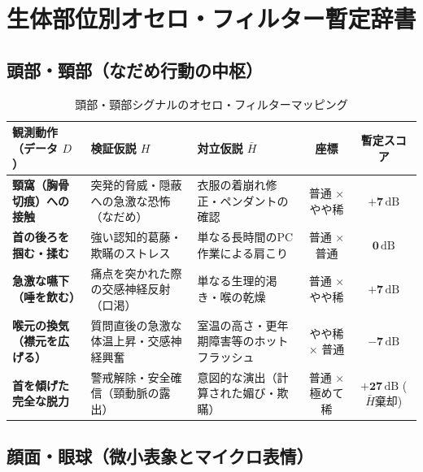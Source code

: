 \section{生体部位別オセロ・フィルター暫定辞書}

\subsection{頭部・頸部（なだめ行動の中枢）}

\begin{table}[htbp]
\centering
\small
\caption{頭部・頸部シグナルのオセロ・フィルターマッピング}
\label{tab:dict_head_neck}
\begin{tabular}{p{3.8cm}p{3.6cm}p{3.6cm}cc}
\toprule
\textbf{観測動作（データ $D$）} & \textbf{検証仮説 $H$} & \textbf{対立仮説 $\bar{H}$} & \textbf{座標} & \textbf{暫定スコア} \\
\midrule
\textbf{頸窩（胸骨切痕）への接触} & 突発的脅威・隠蔽への急激な恐怖（なだめ） & 衣服の着崩れ修正・ペンダントの確認 & 普通 $\times$ やや稀 & $\mathbf{+7\,\mathrm{dB}}$ \\
\textbf{首の後ろを掴む・揉む} & 強い認知的葛藤・欺瞞のストレス & 単なる長時間のPC作業による肩こり & 普通 $\times$ 普通 & $\mathbf{0\,\mathrm{dB}}$ \\
\textbf{急激な嚥下（唾を飲む）} & 痛点を突かれた際の交感神経反射（口渇） & 単なる生理的渇き・喉の乾燥 & 普通 $\times$ やや稀 & $\mathbf{+7\,\mathrm{dB}}$ \\
\textbf{喉元の換気（襟元を広げる）} & 質問直後の急激な体温上昇・交感神経興奮 & 室温の高さ・更年期障害等のホットフラッシュ & やや稀 $\times$ 普通 & $\mathbf{-7\,\mathrm{dB}}$ \\
\textbf{首を傾げた完全な脱力} & 警戒解除・安全確信（頸動脈の露出） & 意図的な演出（計算された媚び・欺瞞） & 普通 $\times$ 極めて稀 & $\mathbf{+27\,\mathrm{dB}}$ ($\bar{H}$棄却) \\
\bottomrule
\end{tabular}
\end{table}

\subsection{顔面・眼球（微小表象とマイクロ表情）}

